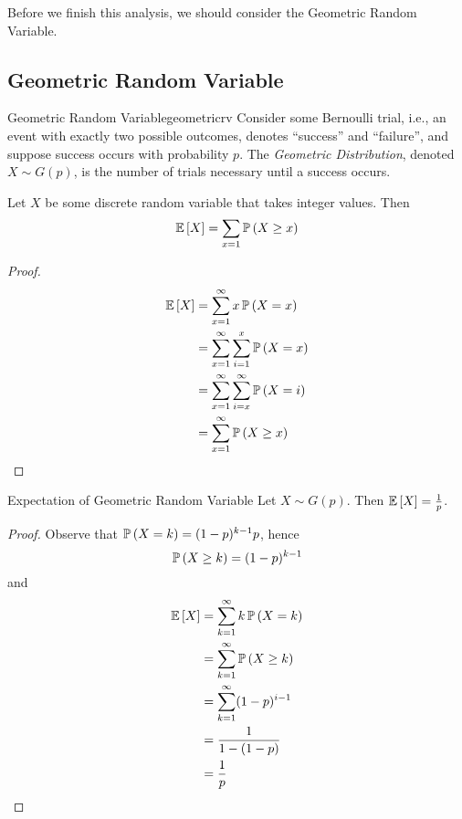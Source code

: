 Before we finish this analysis, we should consider the Geometric Random
Variable.

\subsection{Geometric Random Variable}
\begin{definition}{Geometric Random Variable}{geometricrv}
    Consider some Bernoulli trial, i.e., an event with exactly two possible
    outcomes, denotes ``success'' and ``failure'', and suppose success occurs
    with probability $p$. The \emph{Geometric Distribution}, denoted $X \sim
    G(p)$, is the number of trials necessary until a success occurs. 
\end{definition}

\begin{lemma}{}{}
    Let $X$ be some discrete random variable that takes integer values. Then
    \[\operatorname{\mathbb{E}}\left[X\right] = \sum_{x = 1} \operatorname{\mathbb{P}}\left(X \geq x\right)\]
\end{lemma}

\begin{proof}
    \begin{align*}\operatorname{\mathbb{E}}\left[X\right]
        &= \sum_{x=1}^{\infty}x \operatorname{\mathbb{P}}\left(X=x\right)\\
        &= \sum_{x=1}^{\infty}\sum_{i=1}^x \operatorname{\mathbb{P}}\left(X=x\right)\\
        &= \sum_{x=1}^{\infty}\sum_{i=x}^{\infty}\operatorname{\mathbb{P}}\left(X=i\right)\\
        &= \sum_{x=1}^{\infty}\operatorname{\mathbb{P}}\left(X \geq x\right)
    \end{align*}
\end{proof}

\begin{theorem}{Expectation of Geometric Random Variable}{}
    Let $X \sim G(p)$. Then $\operatorname{\mathbb{E}}\left[X\right] = \frac{1}{p}$.
\end{theorem}

\begin{proof}
    Observe that $\operatorname{\mathbb{P}}\left(X = k\right) = (1 - p)^{k - 1}p$, hence
    \[\operatorname{\mathbb{P}}\left(X \geq k\right) = (1 - p)^{k - 1}\]
    and
    \begin{align*}\operatorname{\mathbb{E}}\left[X\right]
        &= \sum_{k=1}^{\infty} k\operatorname{\mathbb{P}}\left(X = k\right)\\
        &= \sum_{k=1}^{\infty} \operatorname{\mathbb{P}}\left(X \geq k\right)\\
        &= \sum_{k=1}^{\infty} (1 - p)^{i - 1}\\
        &= \frac{1}{1 - (1 - p)}\\
        &= \frac{1}{p}
    \end{align*}
\end{proof}

